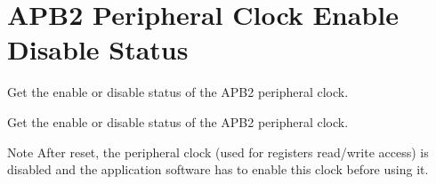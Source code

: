 \hypertarget{group___r_c_c_ex___a_p_b2___peripheral___clock___enable___disable___status}{}\section{A\+P\+B2 Peripheral Clock Enable Disable Status}
\label{group___r_c_c_ex___a_p_b2___peripheral___clock___enable___disable___status}


Get the enable or disable status of the A\+P\+B2 peripheral clock.  


Get the enable or disable status of the A\+P\+B2 peripheral clock. 

\begin{DoxyNote}{Note}
After reset, the peripheral clock (used for registers read/write access) is disabled and the application software has to enable this clock before using it. 
\end{DoxyNote}
